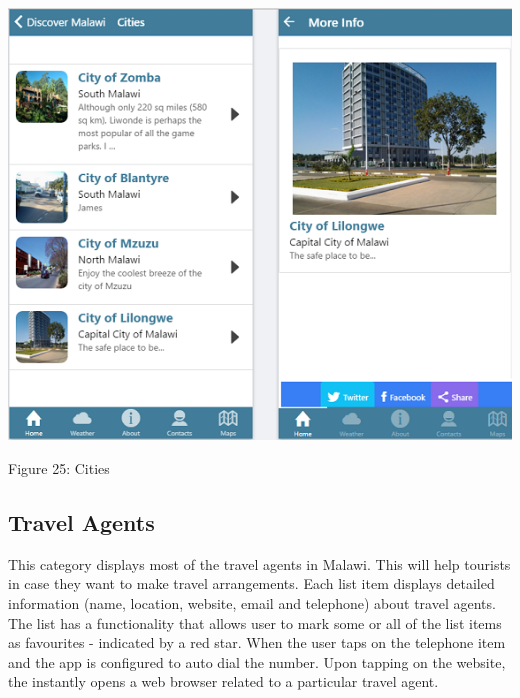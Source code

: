 \begin{center}    
	\includegraphics{img/cities.png}
\end{center}
\begin{center}
	Figure 25: Cities 
\end{center}
\paragraph{}

\subsection{Travel Agents}
This category displays most of the travel agents in Malawi. This will help tourists in case they want to make travel arrangements. Each list item displays detailed information (name, location, website, email and telephone) about travel agents. The list has a functionality that allows user to mark some or all of the list items as favourites - indicated by a red star. When the user taps on the telephone item and the app is configured to auto dial the number. Upon tapping on the website, the instantly opens a web browser related to a particular travel agent.

